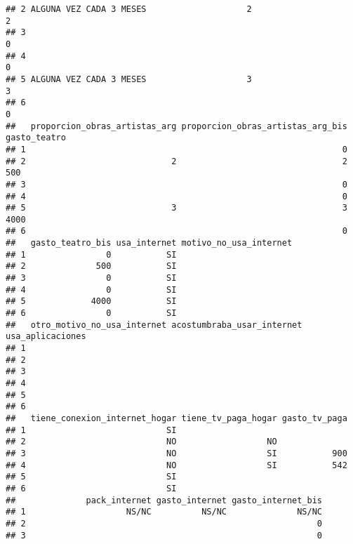 \documentclass[
]{article}
\begin{document}
\begin{verbatim}
## 2 ALGUNA VEZ CADA 3 MESES                    2                        2
## 3                                                                     0
## 4                                                                     0
## 5 ALGUNA VEZ CADA 3 MESES                    3                        3
## 6                                                                     0
##   proporcion_obras_artistas_arg proporcion_obras_artistas_arg_bis gasto_teatro
## 1                                                               0             
## 2                             2                                 2          500
## 3                                                               0             
## 4                                                               0             
## 5                             3                                 3         4000
## 6                                                               0             
##   gasto_teatro_bis usa_internet motivo_no_usa_internet
## 1                0           SI                       
## 2              500           SI                       
## 3                0           SI                       
## 4                0           SI                       
## 5             4000           SI                       
## 6                0           SI                       
##   otro_motivo_no_usa_internet acostumbraba_usar_internet usa_aplicaciones
## 1                                                                        
## 2                                                                        
## 3                                                                        
## 4                                                                        
## 5                                                                        
## 6                                                                        
##   tiene_conexion_internet_hogar tiene_tv_paga_hogar gasto_tv_paga
## 1                            SI                                  
## 2                            NO                  NO              
## 3                            NO                  SI           900
## 4                            NO                  SI           542
## 5                            SI                                  
## 6                            SI                                  
##              pack_internet gasto_internet gasto_internet_bis
## 1                    NS/NC          NS/NC              NS/NC
## 2                                                          0
## 3                                                          0

\end{verbatim}
\end{document}
